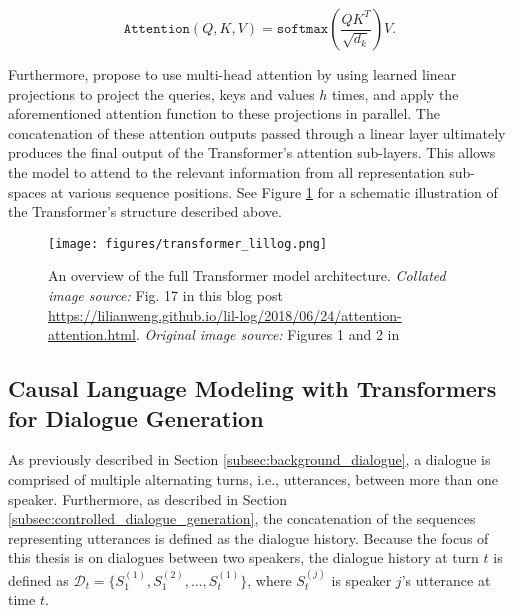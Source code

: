 \begin{equation}
    \texttt{Attention}(Q, K, V) = \texttt{softmax} \left( \frac{QK^T}{\sqrt{d_k}}\right) V.
\end{equation}

Furthermore, \cite{vaswani2017attention} propose to use multi-head attention by using learned linear projections to project the queries, keys and values $h$ times, and apply the aforementioned attention function to these projections in parallel. The concatenation of these attention outputs passed through a linear layer ultimately produces the final output of the Transformer's attention sub-layers. This allows the model to attend to the relevant information from all representation sub-spaces at various sequence positions. See Figure \ref{fig:transformer_architecture} for a schematic illustration of the Transformer's structure described above.


\begin{figure}[H]
    \centering
    \texttt{[image: figures/transformer\_lillog.png]}
    \caption{An overview of the full Transformer model architecture. \textit{Collated image source:} Fig. 17 in this blog post \url{https://lilianweng.github.io/lil-log/2018/06/24/attention-attention.html}. \textit{Original image source:} Figures 1 and 2 in \cite{vaswani2017attention}}
    \label{fig:transformer_architecture}
\end{figure}

\subsection{Causal Language Modeling with Transformers for Dialogue Generation}
\label{subsec:causal_lm_with_transformers_dialogue_gen}
As previously described in Section \ref{subsec:background_dialogue}, 
a dialogue is comprised of multiple alternating turns, i.e., utterances, between more than one speaker. Furthermore, as described in Section \ref{subsec:controlled_dialogue_generation}, the concatenation of the sequences representing utterances is defined as the dialogue history. Because the focus of this thesis is on dialogues between two speakers, the dialogue history at turn $t$ is defined as $\mathcal{D}_t = \{S^{(1)}_1, S^{(2)}_1, ..., S^{(1)}_t\}$, where $S^{(j)}_t$ is speaker $j$'s utterance at time $t$. 

